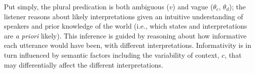 \documentclass[linguex]{sp}
\begin{document}
Put simply, the plural predication is both ambiguous ($v$) and vague ($\theta_{c}$, $\theta_d$); the listener reasons about likely interpretations given an intuitive understanding of speakers and prior knowledge of the world (i.e., which states and interpretations are \emph{a priori} likely). This inference is guided by reasoning about how informative each utterance would have been, with different interpretations. Informativity is in turn influenced by semantic factors including the variability of context, $c$, that may differentially affect the different interpretations.


%
%
%
%
%
%
\end{document}
